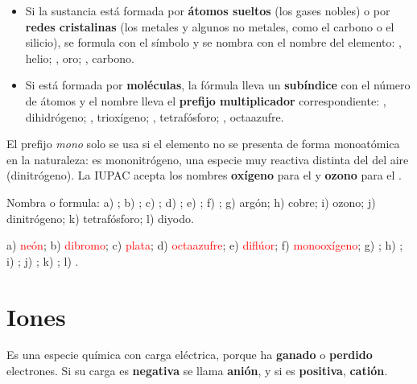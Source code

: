 \begin{itemize}
    \item Si la sustancia está formada por \textbf{átomos sueltos} (los gases nobles) o por \textbf{redes cristalinas} (los
    metales y algunos no metales, como el carbono o el silicio), se formula con el símbolo y se nombra con el nombre del
    elemento: , helio; , oro; , carbono.
    \item Si está formada por \textbf{moléculas}, la fórmula lleva un \textbf{subíndice} con el número de átomos y el nombre
    lleva el \textbf{prefijo multiplicador} correspondiente: , dihidrógeno; , trioxígeno; , tetrafósforo;
    , octaazufre.
\end{itemize}

El prefijo \textit{mono} solo se usa si el elemento no se presenta de forma monoatómica en la naturaleza:  es
mononitrógeno, una especie muy reactiva distinta del  del aire (dinitrógeno). La IUPAC acepta los nombres \textbf{oxígeno}
para el  y \textbf{ozono} para el .

\begin{exercise}
    Nombra o formula: a) ; b) ; c) ; d) ; e) ; f) ; g) argón; h) cobre; i) ozono;
    j) dinitrógeno; k) tetrafósforo; l) diyodo.
    \begin{solu}
        a) \textcolor{red}{neón}; b) \textcolor{red}{dibromo}; c) \textcolor{red}{plata}; d) \textcolor{red}{octaazufre};
        e) \textcolor{red}{diflúor}; f) \textcolor{red}{monooxígeno}; g) \textcolor{red}{}; h) \textcolor{red}{};
        i) \textcolor{red}{}; j) \textcolor{red}{}; k) \textcolor{red}{}; l) \textcolor{red}{}.
    \end{solu}
\end{exercise}

\section{Iones}\label{sec:ud5-iones}

\begin{definition}[Ion]
    Es una especie química con carga eléctrica, porque ha \textbf{ganado} o \textbf{perdido} electrones. Si su carga es
    \textbf{negativa} se llama \textbf{anión}, y si es \textbf{positiva}, \textbf{catión}.
\end{definition}


